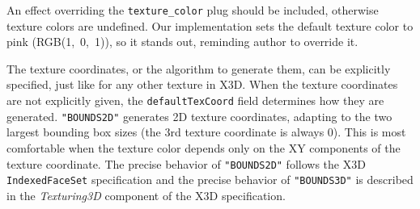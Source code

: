 \documentclass{egpubl}
\begin{document}

An effect overriding the \texttt{texture\_color} plug
should be included, otherwise texture colors are undefined.
Our implementation
sets the default texture color to pink (RGB(1,~0,~1)), so it stands out,
reminding author to override it.

The texture coordinates, or the algorithm to generate them,
can be explicitly specified, just like for any other texture in X3D.
When the texture coordinates are not explicitly given,
the \texttt{defaultTexCoord} field determines how they are generated.
\texttt{"BOUNDS2D"} generates 2D texture coordinates,
adapting to the two largest bounding box sizes
(the 3rd texture coordinate is always 0). This is most comfortable
when the texture color depends only on the XY components of the texture coordinate.
The precise behavior
of \texttt{"BOUNDS2D"} follows the X3D \texttt{IndexedFaceSet} specification
and the precise behavior of \texttt{"BOUNDS3D"} is described in
the \textit{Texturing3D} component of the X3D specification.




\end{document}
